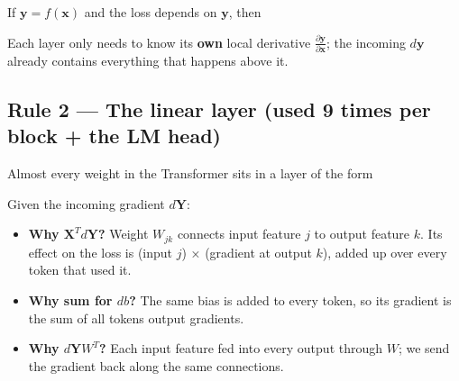 \documentclass[11pt,a4paper,oneside]{report}
\providecommand{\tightlist}{\setlength{\itemsep}{0pt}\setlength{\parskip}{0pt}}
\begin{document}
If \(\mathbf{y} = f(\mathbf{x})\) and the loss depends on \(\mathbf{y}\), then

\begin{center}\end{center}

Each layer only needs to know its \textbf{own} local derivative \(\frac{\partial \mathbf{y}}{\partial \mathbf{x}}\); the incoming \(d\mathbf{y}\) already contains everything that happens above it.

\subsection{Rule 2 --- The linear layer (used 9 times per block + the LM head)}\label{rule-2--the-linear-layer-used-9-times-per-block--the-lm-head}

Almost every weight in the Transformer sits in a layer of the form

\begin{center}\end{center}

Given the incoming gradient \(d\mathbf{Y}\):

\begin{center}\end{center}

\begin{itemize}
\tightlist
\item
  \textbf{Why \(\mathbf{X}^T d\mathbf{Y}\)?} Weight \(W_{jk}\) connects input feature \(j\) to output feature \(k\). Its effect on the loss is (input \(j\)) × (gradient at output \(k\)), added up over every token that used it.
\item
  \textbf{Why sum for \(db\)?} The same bias is added to every token, so its gradient is the sum of all tokens\textquotesingle{} output gradients.
\item
  \textbf{Why \(d\mathbf{Y} W^T\)?} Each input feature fed into every output through \(W\); we send the gradient back along the same connections.
\end{itemize}
\end{document}
